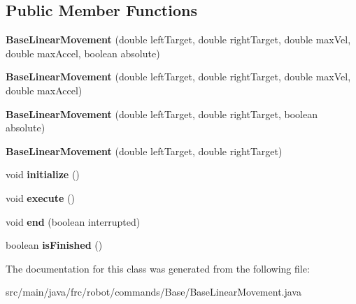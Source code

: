\subsection*{Public Member Functions}
\begin{DoxyCompactItemize}
\item 
\mbox{\label{classfrc_1_1robot_1_1commands_1_1_base_1_1_base_linear_movement_a1af6ecff9bd65706bb843f07cbeed37f}} 
{\bfseries Base\+Linear\+Movement} (double left\+Target, double right\+Target, double max\+Vel, double max\+Accel, boolean absolute)
\item 
\mbox{\label{classfrc_1_1robot_1_1commands_1_1_base_1_1_base_linear_movement_a7d738e15ce6bab243a8dc28a409cfaf7}} 
{\bfseries Base\+Linear\+Movement} (double left\+Target, double right\+Target, double max\+Vel, double max\+Accel)
\item 
\mbox{\label{classfrc_1_1robot_1_1commands_1_1_base_1_1_base_linear_movement_a33eae91aa6930e3763ac81e633eaa532}} 
{\bfseries Base\+Linear\+Movement} (double left\+Target, double right\+Target, boolean absolute)
\item 
\mbox{\label{classfrc_1_1robot_1_1commands_1_1_base_1_1_base_linear_movement_a12835fb62d61ef90183bf5694cdc9463}} 
{\bfseries Base\+Linear\+Movement} (double left\+Target, double right\+Target)
\item 
\mbox{\label{classfrc_1_1robot_1_1commands_1_1_base_1_1_base_linear_movement_aeb46a0172c7c4a91f99ef746f3d4a39c}} 
void {\bfseries initialize} ()
\item 
\mbox{\label{classfrc_1_1robot_1_1commands_1_1_base_1_1_base_linear_movement_abbe8aae460363811534aa815c2c18aca}} 
void {\bfseries execute} ()
\item 
\mbox{\label{classfrc_1_1robot_1_1commands_1_1_base_1_1_base_linear_movement_a7398c8708e08e02e230f92b1092de048}} 
void {\bfseries end} (boolean interrupted)
\item 
\mbox{\label{classfrc_1_1robot_1_1commands_1_1_base_1_1_base_linear_movement_a10398fc546e68a3e1e0fdfeeab8bd0df}} 
boolean {\bfseries is\+Finished} ()
\end{DoxyCompactItemize}


The documentation for this class was generated from the following file\+:\begin{DoxyCompactItemize}
\item 
src/main/java/frc/robot/commands/\+Base/Base\+Linear\+Movement.\+java\end{DoxyCompactItemize}
